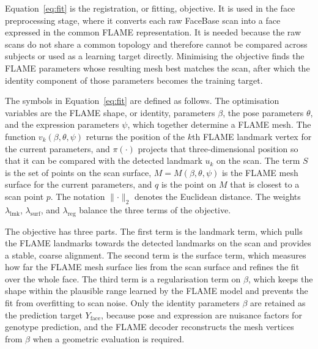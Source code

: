 Equation~\ref{eq:fit} is the registration, or fitting, objective. It is used in the face preprocessing stage, where it converts each raw FaceBase scan into a face expressed in the common FLAME representation. It is needed because the raw scans do not share a common topology and therefore cannot be compared across subjects or used as a learning target directly. Minimising the objective finds the FLAME parameters whose resulting mesh best matches the scan, after which the identity component of those parameters becomes the training target.

The symbols in Equation~\ref{eq:fit} are defined as follows. The optimisation variables are the FLAME shape, or identity, parameters $\beta$, the pose parameters $\theta$, and the expression parameters $\psi$, which together determine a FLAME mesh. The function $v_k(\beta,\theta,\psi)$ returns the position of the $k$th FLAME landmark vertex for the current parameters, and $\pi(\cdot)$ projects that three-dimensional position so that it can be compared with the detected landmark $u_k$ on the scan. The term $S$ is the set of points on the scan surface, $M=M(\beta,\theta,\psi)$ is the FLAME mesh surface for the current parameters, and $q$ is the point on $M$ that is closest to a scan point $p$. The notation $\lVert\cdot\rVert_2$ denotes the Euclidean distance. The weights $\lambda_{\mathrm{lmk}}$, $\lambda_{\mathrm{surf}}$, and $\lambda_{\mathrm{reg}}$ balance the three terms of the objective.

The objective has three parts. The first term is the landmark term, which pulls the FLAME landmarks towards the detected landmarks on the scan and provides a stable, coarse alignment. The second term is the surface term, which measures how far the FLAME mesh surface lies from the scan surface and refines the fit over the whole face. The third term is a regularisation term on $\beta$, which keeps the shape within the plausible range learned by the FLAME model and prevents the fit from overfitting to scan noise. Only the identity parameters $\beta$ are retained as the prediction target $Y_{\mathrm{face}}$, because pose and expression are nuisance factors for genotype prediction, and the FLAME decoder reconstructs the mesh vertices from $\beta$ when a geometric evaluation is required.

